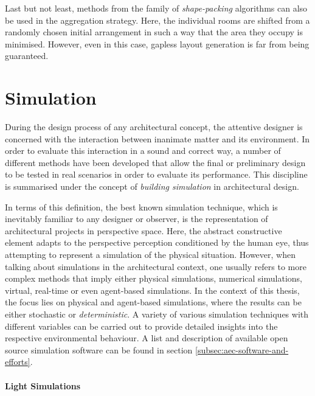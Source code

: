 \documentclass[a4paper, 12pt]{report}
\begin{document}
Last but not least, methods from the family of \textit{shape-packing} algorithms can also be used in the aggregation strategy. Here, the individual rooms are shifted from a randomly chosen initial arrangement in such a way that the area they occupy is minimised. However, even in this case, gapless layout generation is far from being guaranteed.

\section{Simulation}\label{sec:simulation}

During the design process of any architectural concept, the attentive designer is concerned with the interaction between inanimate matter and its environment. In order to evaluate this interaction in a sound and correct way, a number of different methods have been developed that allow the final or preliminary design to be tested in real scenarios in order to evaluate its performance. This discipline is summarised under the concept of \textit{building simulation} in architectural design.

In terms of this definition, the best known simulation technique, which is inevitably familiar to any designer or observer, is the representation of architectural projects in perspective space. Here, the abstract constructive element adapts to the perspective perception conditioned by the human eye, thus attempting to represent a simulation of the physical situation. However, when talking about simulations in the architectural context, one usually refers to more complex methods that imply either physical simulations, numerical simulations, virtual, real-time or even agent-based simulations. In the context of this thesis, the focus lies on physical and agent-based simulations, where the results can be either \gls{stochastic} or \textit{\gls{deterministic}}. A variety of various simulation techniques with different variables can be carried out to provide detailed insights into the respective environmental behaviour. A list and description of available \gls{open source} simulation software can be found in section \ref{subsec:aec-software-and-efforts}.

\paragraph{Light Simulations}\label{par:light-simulations}
\end{document}
